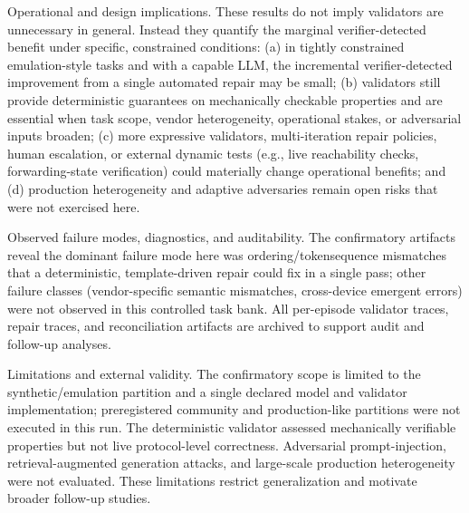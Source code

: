 \documentclass[conference]{IEEEtran}
\begin{document}
Operational and design implications. These results do not imply validators are unnecessary in general. Instead they quantify the marginal verifier-detected benefit under specific, constrained conditions: (a) in tightly constrained emulation-style tasks and with a capable LLM, the incremental verifier-detected improvement from a single automated repair may be small; (b) validators still provide deterministic guarantees on mechanically checkable properties and are essential when task scope, vendor heterogeneity, operational stakes, or adversarial inputs broaden; (c) more expressive validators, multi-iteration repair policies, human escalation, or external dynamic tests (e.g., live reachability checks, forwarding-state verification) could materially change operational benefits; and (d) production heterogeneity and adaptive adversaries remain open risks that were not exercised here.

Observed failure modes, diagnostics, and auditability. The confirmatory artifacts reveal the dominant failure mode here was ordering/tokensequence mismatches that a deterministic, template-driven repair could fix in a single pass; other failure classes (vendor-specific semantic mismatches, cross-device emergent errors) were not observed in this controlled task bank. All per-episode validator traces, repair traces, and reconciliation artifacts are archived to support audit and follow-up analyses.

Limitations and external validity. The confirmatory scope is limited to the synthetic/emulation partition and a single declared model and validator implementation; preregistered community and production-like partitions were not executed in this run. The deterministic validator assessed mechanically verifiable properties but not live protocol-level correctness. Adversarial prompt-injection, retrieval-augmented generation attacks, and large-scale production heterogeneity were not evaluated. These limitations restrict generalization and motivate broader follow-up studies.
\end{document}
